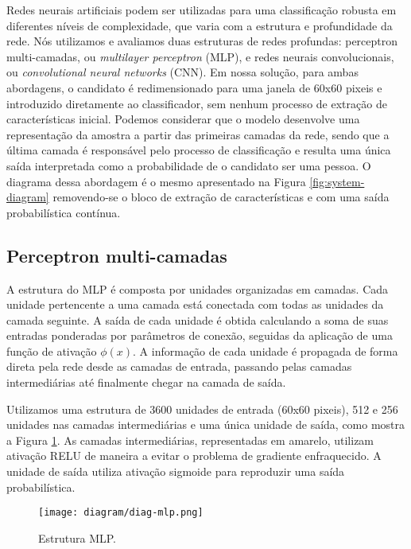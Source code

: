     Redes neurais artificiais podem ser utilizadas para uma classificação robusta em diferentes níveis de complexidade, que varia com a estrutura e profundidade da rede. Nós utilizamos e avaliamos duas estruturas de redes profundas: perceptron multi-camadas, ou \textit{multilayer perceptron} (MLP), e redes neurais convolucionais, ou \textit{convolutional neural networks} (CNN). Em nossa solução, para ambas abordagens, o candidato é redimensionado para uma janela de 60x60 pixeis e introduzido diretamente ao classificador, sem nenhum processo de extração de características inicial. Podemos considerar que o modelo desenvolve uma representação da amostra a partir das primeiras camadas da rede, sendo que a última camada é responsável pelo processo de classificação e resulta uma única saída interpretada como a probabilidade de o candidato ser uma pessoa. O diagrama dessa abordagem é o mesmo apresentado na Figura \ref{fig:system-diagram} removendo-se o bloco de extração de características e com uma saída probabilística contínua.

    \subsection{Perceptron multi-camadas}
        A estrutura do MLP é composta por unidades organizadas em camadas. Cada unidade pertencente a uma camada está conectada com todas as unidades da camada seguinte. A saída de cada unidade é obtida calculando a soma de suas entradas ponderadas por parâmetros de conexão, seguidas da aplicação de uma função de ativação $\phi(x)$. A informação de cada unidade é propagada de forma direta pela rede desde as camadas de entrada, passando pelas camadas intermediárias até finalmente chegar na camada de saída.

        Utilizamos uma estrutura de 3600 unidades de entrada (60x60 pixeis), 512 e 256 unidades nas camadas intermediárias e uma única unidade de saída, como mostra a Figura \ref{fig:diag-mlp}. As camadas intermediárias, representadas em amarelo, utilizam ativação RELU \cite{nair2010relu} de maneira a evitar o problema de gradiente enfraquecido. A unidade de saída utiliza ativação sigmoide para reproduzir uma saída probabilística.

        \begin{figure}
        \centering
        \texttt{[image: diagram/diag-mlp.png]}
        \caption{Estrutura MLP.}
        \label{fig:diag-mlp}
        \end{figure}

